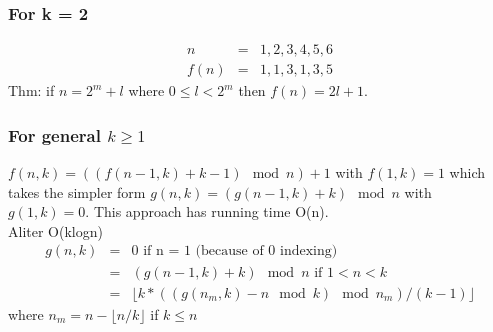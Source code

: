 \documentclass[8pt, a4paper, oneside, twocolumn]{extarticle}
\begin{document}
\subsubsection{For k = 2}
\begin{eqnarray}n & = & 1, 2, 3, 4, 5, 6\\
f(n) & = & 1, 1, 3, 1, 3, 5
\end{eqnarray}
Thm: if $n = 2^m + l$ where $0 \leq l < 2^m$ then $f(n) = 2l + 1$.
\subsubsection{For general $k \geq 1$}
$f(n, k) =  ((f(n - 1, k) + k - 1) \mod n) + 1$ with $f(1, k) = 1$ which takes the simpler form $g(n, k) = (g(n - 1, k) + k) \mod n$ with $g(1, k) = 0$. This approach has running time O(n).
\\Aliter O(klogn)
\begin{eqnarray}
g(n, k) &=& 0 \text{ if n = 1 (because of 0 indexing)}\\
        &=& (g(n - 1, k) + k) \mod n \text{ if $1 < n < k$}\\
        &=& \lfloor k * ((g(n_m, k) - n \mod k) \mod n_m) / (k - 1) \rfloor 
\end{eqnarray}
where $n_m = n - \lfloor n/k \rfloor$ if $k \leq n$
\end{document}

